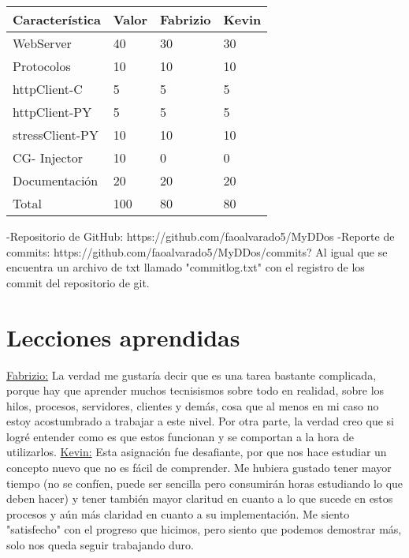 \documentclass{report}
\begin{document}
{{{{{{{{\begin{tabular}{x y z w}
Caracter\'istica & Valor & Fabrizio & Kevin \\ \hline
WebServer & 40 & 30 & 30\\
Protocolos & 10 & 10 & 10\\
httpClient-C & 5 & 5 & 5\\
httpClient-PY & 5 & 5 & 5\\
stressClient-PY & 10 & 10 & 10\\
CG- Injector & 10 & 0 & 0\\
Documentaci\'on & 20 & 20 & 20\\ \hline
Total & 100 & 80 & 80 \\ \hline
\end{tabular}
\newline
\newline
\newline
\newline
\newline
-Repositorio de GitHub: \newline
https://github.com/faoalvarado5/MyDDos \newline
\newline
-Reporte de commits: \newline
https://github.com/faoalvarado5/MyDDos/commits?\newline
Al igual que se encuentra un archivo de txt llamado "commitlog.txt" con el registro de los commit del repositorio de git.

\newpage
\section{Lecciones aprendidas}
\newline
{\underline {Fabrizio:}\newline
\newline
La verdad me gustar\'ia decir que es una tarea bastante complicada, porque hay que aprender muchos tecnisismos sobre todo en realidad, sobre los hilos, procesos, servidores, clientes y dem\'as, cosa que al menos en mi caso no estoy acostumbrado a trabajar a este nivel.
\newline
Por otra parte, la verdad creo que si logr\'e entender como es que estos funcionan y se comportan a la hora de utilizarlos.
\newline
\newline
{\underline {Kevin:}
\newline
\newline
Esta asignaci\'on fue desafiante, por que nos hace estudiar un concepto nuevo que no es f\'acil de comprender. Me hubiera gustado tener mayor tiempo (no se conf\'ien, puede ser sencilla pero consumir\'an horas estudiando lo que deben hacer) y tener tambi\'en mayor claritud en cuanto a lo que sucede en estos procesos y a\'un m\'as claridad en cuanto a su implementaci\'on. Me siento "satisfecho" con el progreso que hicimos, pero siento que podemos demostrar m\'as, solo nos queda seguir trabajando duro.
\newpage
}}}}}}}}}}
\end{document}
